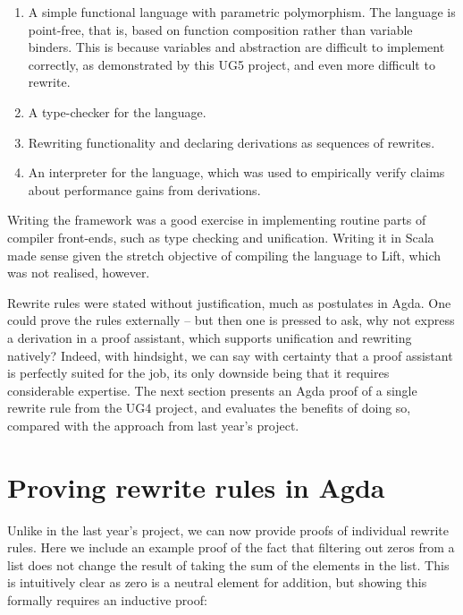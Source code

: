 \documentclass[bsc,frontabs,oneside,singlespacing,parskip,deptreport]{infthesis}
\theoremstyle{definition}
\theoremstyle{lemma}
\begin{document}
\begin{enumerate}
\item A simple functional language with parametric polymorphism. The
  language is point-free, that is, based on function composition
  rather than variable binders. This is because variables and
  abstraction are difficult to implement correctly, as demonstrated by
  this UG5 project, and even more difficult to rewrite.

\item A type-checker for the language.

\item Rewriting functionality and declaring derivations as sequences of
  rewrites.

\item An interpreter for the language, which was used to empirically
  verify claims about performance gains from derivations.
\end{enumerate}

Writing the framework was a good exercise in implementing routine
parts of compiler front-ends, such as type checking and
unification. Writing it in Scala made sense given the stretch
objective of compiling the language to Lift, which was not realised,
however.

Rewrite rules were stated without justification, much as postulates in
Agda. One could prove the rules externally – but then one is pressed
to ask, why not express a derivation in a proof assistant, which
supports unification and rewriting natively? Indeed, with hindsight,
we can say with certainty that a proof assistant is perfectly suited
for the job, its only downside being that it requires considerable
expertise.  The next section presents an Agda proof of a single rewrite rule
from the UG4 project, and evaluates the benefits of doing so,
compared with the approach from last year's project.

\section{Proving rewrite rules in Agda}
\label{sec:progr-deriv-agda}

Unlike in the last year's project, we can now provide proofs of
individual rewrite rules. Here we include an example proof of the fact
that filtering out zeros from a list does not change the result of
taking the sum of the elements in the list. This is intuitively clear
as zero is a neutral element for addition, but showing this formally
requires an inductive proof:
\end{document}
